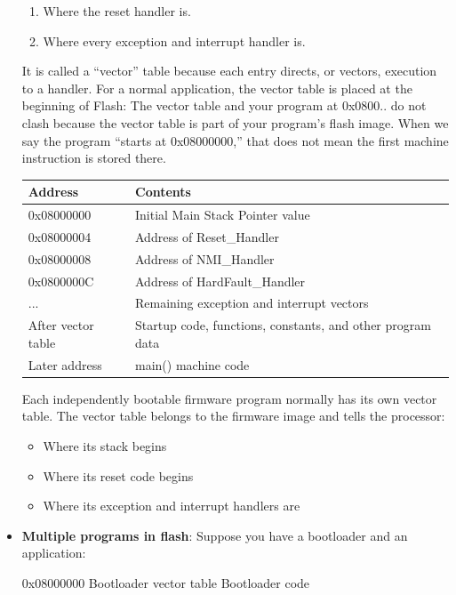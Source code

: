 \documentclass{report}
\begin{document}
\begin{itemize}
\begin{enumerate}
                \item Where the reset handler is.
                \item Where every exception and interrupt handler is.
            \end{enumerate}
            It is called a “vector” table because each entry directs, or vectors, execution to a handler. For a normal application, the vector table is placed at the beginning of Flash:
            \bigbreak \noindent 
            The vector table and your program at 0x0800.. do not clash because the vector table is part of your program’s flash image. When we say the program “starts at 0x08000000,” that does not mean the first machine instruction is stored there.
            \begin{center}
                \begin{tabularx}{\textwidth}{@{}XX@{}}
                    \toprule
                    \textbf{Address}&	\textbf{Contents} \\
                    \midrule
                    0x08000000	&Initial Main Stack Pointer value\\[2ex]
                    0x08000004	&Address of Reset\_Handler\\[2ex]
                    0x08000008	&Address of NMI\_Handler\\[2ex]
                    0x0800000C	&Address of HardFault\_Handler\\[2ex]
                    ...	&Remaining exception and interrupt vectors\\[2ex]
                    After vector table	&Startup code, functions, constants, and other program data \\[2ex]
                    Later address	&main() machine code \\
                    \bottomrule
                \end{tabularx}
            \end{center}
            Each independently bootable firmware program normally has its own vector table. The vector table belongs to the firmware image and tells the processor:
            \begin{itemize}
                \item Where its stack begins
                \item Where its reset code begins
                \item Where its exception and interrupt handlers are
            \end{itemize}
        \item \textbf{Multiple programs in flash}: Suppose you have a bootloader and an application:
            \bigbreak \noindent 
            \begin{ccode}
            0x08000000  Bootloader vector table
                Bootloader code


\end{ccode}
\end{itemize}
\end{document}
